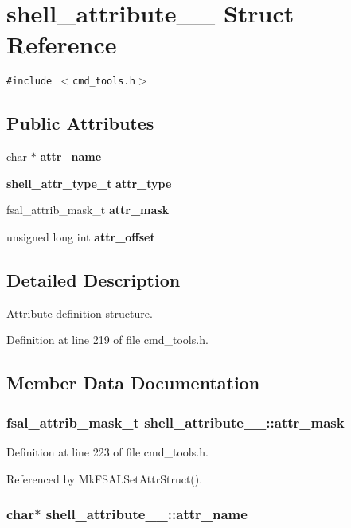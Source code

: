 \section{shell\_\-attribute\_\-\_\- Struct Reference}
\label{structshell__attribute____}
{\tt \#include $<$cmd\_\-tools.h$>$}

\subsection*{Public Attributes}
\begin{CompactItemize}
\item 
char $\ast$ {\bf attr\_\-name}
\item 
{\bf shell\_\-attr\_\-type\_\-t} {\bf attr\_\-type}
\item 
fsal\_\-attrib\_\-mask\_\-t {\bf attr\_\-mask}
\item 
unsigned long int {\bf attr\_\-offset}
\end{CompactItemize}


\subsection{Detailed Description}
Attribute definition structure. 



Definition at line 219 of file cmd\_\-tools.h.

\subsection{Member Data Documentation}
\subsubsection{\setlength{\rightskip}{0pt plus 5cm}fsal\_\-attrib\_\-mask\_\-t {\bf shell\_\-attribute\_\-\_\-::attr\_\-mask}}\label{structshell__attribute_____o2}




Definition at line 223 of file cmd\_\-tools.h.

Referenced by Mk\-FSALSet\-Attr\-Struct().
\subsubsection{\setlength{\rightskip}{0pt plus 5cm}char$\ast$ {\bf shell\_\-attribute\_\-\_\-::attr\_\-name}}\label{structshell__attribute_____o0}




